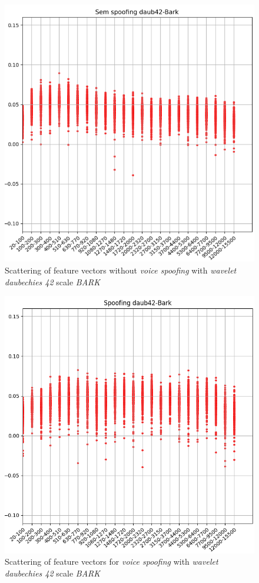 \begin{figure}[!h]
	\centering
	\includegraphics[width=.70\linewidth, height=.68\linewidth]{images/results/barkVersusMel/liveDaub42Bark}
	\caption{Scattering of feature vectors without \textit{voice spoofing} with \textit{wavelet daubechies 42} scale \textit{BARK}}
	\label{fig:livedaub42bark}
\end{figure}

\begin{figure}[!h]
	\centering
	\includegraphics[width=.70\linewidth, height=.68\linewidth]{images/results/barkVersusMel/spoofingDaub42Bark}
	\caption{Scattering of feature vectors for \textit{voice spoofing} with \textit{wavelet daubechies 42} scale \textit{BARK}}
	\label{fig:spoofingdaub42bark}
\end{figure}

